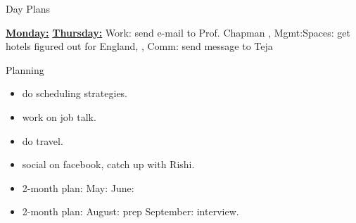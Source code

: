 \begin{frame}{Day Plans}

  
  \underline{\bf{Monday}:}
  \underline{\bf{Thursday}:} Work: send e-mail to Prof. Chapman  , Mgmt:Spaces: get hotels figured out for England, 
  , Comm: send message to Teja 
 
\end{frame} 
\begin{block}{Planning} 

\begin{itemize}
\tiny \item \tiny do scheduling strategies. 
\item \tiny work on job talk. 
\item \tiny do travel. 
\item \tiny social on facebook, catch up with Rishi. 
\end{itemize} 
\begin{itemize} 
\item \tiny 2-month plan: May:  June:  
\item \tiny 2-month plan: August:  prep September: interview. 
\end{itemize}
\end{block}

